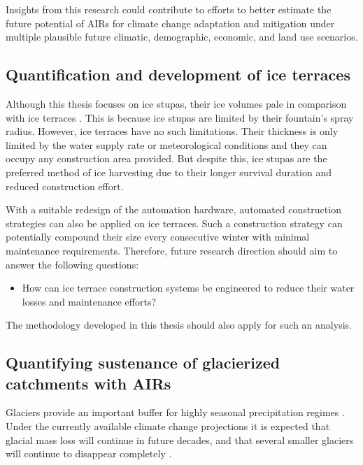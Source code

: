 Insights from this research could contribute to efforts to better estimate the future potential of AIRs for
climate change adaptation and mitigation under multiple plausible future climatic, demographic, economic, and
land use scenarios.


\subsection{Quantification and development of ice terraces}

Although this thesis focuses on ice stupas, their ice volumes pale in comparison with ice terraces
\citep{nusserSociohydrologyArtificialGlaciers2019}. This is because ice stupas are limited by their fountain's
spray radius. However, ice terraces have no such limitations. Their thickness is only limited by the water
supply rate or meteorological conditions and they can occupy any construction area provided. But despite this, ice
stupas are the preferred method of ice harvesting due to their longer survival duration and reduced construction
effort.

With a suitable redesign of the automation hardware, automated construction strategies can also be applied on
ice terraces. Such a construction strategy can potentially compound their size every consecutive winter with
minimal maintenance requirements. Therefore, future research direction should aim to answer the following
questions:

\begin{itemize}

	\item How can ice terrace construction systems be engineered to reduce their water losses and maintenance
	      efforts?

\end{itemize}

The methodology developed in this thesis should also apply for such an analysis.

\subsection{Quantifying sustenance of glacierized catchments with AIRs}

Glaciers provide an important buffer for highly seasonal precipitation regimes
\citep{kaserContributionPotentialGlaciers2010}. Under the currently available climate change projections it is
expected that glacial mass loss will continue in future decades, and that several smaller glaciers will continue
to disappear completely \citep{rabatelCurrentStateGlaciers2013}.

